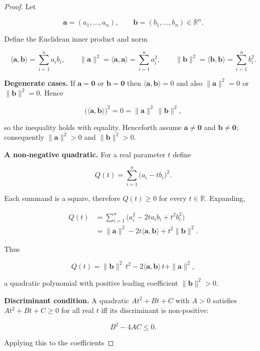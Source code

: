 \begin{proof}
Let  

\[
\mathbf a=(a_{1},\dots ,a_{n}),\qquad   
\mathbf b=(b_{1},\dots ,b_{n})\in\mathbb R^{n}.
\]

Define the Euclidean inner product and norm  

\[
\langle\mathbf a,\mathbf b\rangle =\sum_{i=1}^{n}a_{i}b_{i},\qquad 
\|\mathbf a\|^{2}= \langle\mathbf a,\mathbf a\rangle =\sum_{i=1}^{n}a_{i}^{2},\qquad 
\|\mathbf b\|^{2}= \langle\mathbf b,\mathbf b\rangle =\sum_{i=1}^{n}b_{i}^{2}.
\]

\medskip\noindent\textbf{Degenerate cases.}  
If \(\mathbf a=\mathbf 0\) or \(\mathbf b=\mathbf 0\) then  
\(\langle\mathbf a,\mathbf b\rangle =0\) and also \(\|\mathbf a\|^{2}=0\) or \(\|\mathbf b\|^{2}=0\). Hence  

\[
\bigl(\langle\mathbf a,\mathbf b\rangle\bigr)^{2}=0=
\|\mathbf a\|^{2}\,\|\mathbf b\|^{2},
\]

so the inequality holds with equality.  
Henceforth assume \(\mathbf a\neq\mathbf 0\) and \(\mathbf b\neq\mathbf 0\); consequently  
\(\|\mathbf a\|^{2}>0\) and \(\|\mathbf b\|^{2}>0\).

\medskip\noindent\textbf{A non‑negative quadratic.}  
For a real parameter \(t\) define  

\[
Q(t)=\sum_{i=1}^{n}\bigl(a_{i}-t b_{i}\bigr)^{2}.
\]

Each summand is a square, therefore \(Q(t)\ge 0\) for every \(t\in\mathbb R\). Expanding,

\[
\begin{aligned}
Q(t)&=\sum_{i=1}^{n}\bigl(a_{i}^{2}-2t a_{i}b_{i}+t^{2}b_{i}^{2}\bigr)\\[2mm]
    &=\|\mathbf a\|^{2}-2t\langle\mathbf a,\mathbf b\rangle
      +t^{2}\|\mathbf b\|^{2}.
\end{aligned}
\]

Thus  

\[
Q(t)=\|\mathbf b\|^{2}\,t^{2}-2\langle\mathbf a,\mathbf b\rangle\,t+\|\mathbf a\|^{2},
\]

a quadratic polynomial with positive leading coefficient \(\|\mathbf b\|^{2}>0\).

\medskip\noindent\textbf{Discriminant condition.}  
A quadratic \(At^{2}+Bt+C\) with \(A>0\) satisfies \(At^{2}+Bt+C\ge0\) for all real \(t\) iff its discriminant is non‑positive:

\[
B^{2}-4AC\le0 .
\]

Applying this to the coefficients  


\end{proof}
